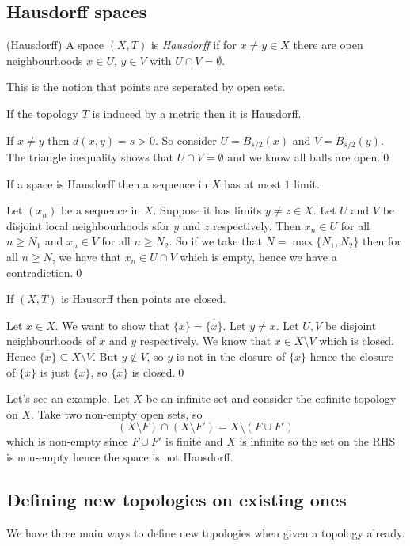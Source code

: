 \documentclass{article}
\begin{document}
\subsection{Hausdorff spaces}
\begin{definition}
	(Hausdorff) A space $ (X,T) $ is \textit{Hausdorff} if for $ x\ne y \in X $ there are open neighbourhoods $ x\in U $, $ y\in V $ with $ U\cap V=\emptyset $.
\end{definition}
\begin{remark}
  This is the notion that points are seperated by open sets.
\end{remark}
\begin{lemma}
  If the topology $ T $ is induced by a metric then it is Hausdorff.
\end{lemma}
\pf If $ x\ne y $ then $ d(x,y) = s>0 $. So consider $ U=B_{s/2}(x) $ and $ V= B_{s/2}(y) $. The triangle inequality shows that $ U\cap V = \emptyset $ and we know all balls are open.\qed
\begin{proposition}
  If a space is Hausdorff then a sequence in $ X $ has at most $ 1 $ limit.
\end{proposition}
\pf Let $ (x_n) $ be a sequence in $ X $. Suppose it has limits $ y\ne z\in X $. Let $ U $ and $ V $ be disjoint local neighbourhoods sfor $ y $ and $ z $ respectively. Then $ x_n\in U $ for all $ n\ge N_1 $ and $ x_n\in V $ for all $ n\ge N_2 $. So if we take that $ N=\max\{N_1,N_2\} $ then for all $ n\ge N $, we have that $ x_n\in U\cap V $ which is empty, hence we have a contradiction.\qed
\begin{proposition}
  If $ (X,T) $ is Hausorff then points are closed.
\end{proposition}
\pf Let $ x\in X $. We want to show that $ \{x\}=\overline{\{x\}} $. Let $ y\ne x $. Let $ U,V $ be disjoint neighbourhoods of $ x $ and $ y $ respectively. We know that $ x\in X\setminus V $ which is closed. Hence $ \overline{\{x\}}\subseteq X\setminus V $. But $ y\notin V $, so $ y $ is not in the closure of $ \{x\} $ hence the closure of $ \{x\} $ is just $ \{x\} $, so $ \{x\} $ is closed.\qed
\par
Let's see an example. Let $ X $ be an infinite set and consider the cofinite topology on $ X $. Take two non-empty open sets, so
\[
	(X\setminus F) \cap (X\setminus F') = X\setminus (F\cup F')
\]
which is non-empty since $ F\cup F' $ is finite and $ X $ is infinite so the set on the RHS is non-empty hence the space is not Hausdorff.
\subsection{Defining new topologies on existing ones}
We have three main ways to define new topologies when given a topology already.
\end{document}
